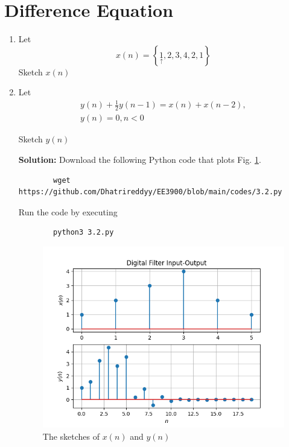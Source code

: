 \documentclass[journal,12pt,twocolumn]{IEEEtran}
\newcommand{\solution}{\noindent \textbf{Solution: }}
\providecommand{\cbrak}[1]{\ensuremath{\left\{#1\right\}}}
\numberwithin{equation}{section}
\renewcommand\thesection{\arabic{section}}
\begin{document}
	\section{Difference Equation}
	\begin{enumerate}[label=\thesection.\arabic*,ref=\thesection.\theenumi]
	\item Let
	\begin{equation}
		x(n) = \cbrak{\underset{\uparrow}{1},2,3,4,2,1}
	\end{equation}
	Sketch $x(n)$
	\item Let
	\begin{multline}
		\label{eq:1}
		y(n) + \frac{1}{2}y(n-1) = x(n) + x(n-2), \\
 		y(n) = 0, n < 0
	\end{multline}
	
	Sketch $y(n)$

	\solution Download the following Python code that plots Fig. \ref{fig-3}.
	\begin{lstlisting}
		wget https://github.com/Dhatrireddyy/EE3900/blob/main/codes/3.2.py
	\end{lstlisting}
	
	Run the code by executing
	\begin{lstlisting}
		python3 3.2.py
	\end{lstlisting}

	\begin{figure}[!ht]
		\centering
		\includegraphics[width=\columnwidth]{figs/3.png}
		\caption{The sketches of $x(n)$ and $y(n)$}
		\label{fig-3}	
	\end{figure}
	

\end{enumerate}
\end{document}
